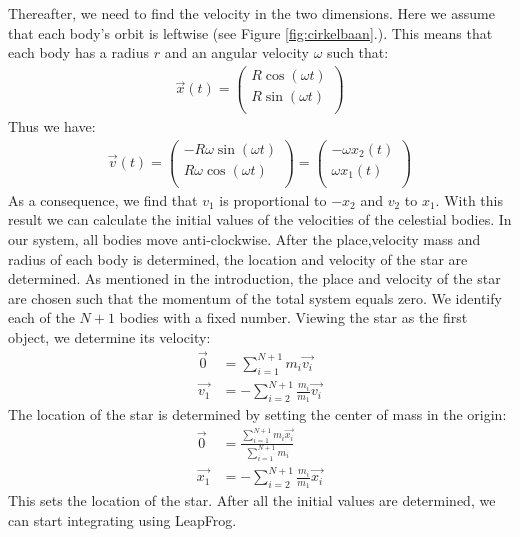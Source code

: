 Thereafter, we need to find the velocity in the two dimensions.
Here we assume that each body's orbit is leftwise (see Figure \ref{fig:cirkelbaan}.).
This means that each body has a radius $r$ and an angular velocity $\omega$ such that:
\begin{align*}
\vec{x}(t) = \begin{pmatrix}
R \cos(\omega t)\\
R \sin(\omega t)\\
\end{pmatrix}
\end{align*} 
Thus we have:
\begin{align*}
\vec{v}(t) = \begin{pmatrix}
-R \omega \sin(\omega t)\\
R \omega \cos(\omega t)\\
\end{pmatrix} = \begin{pmatrix}
-\omega x_2(t)\\
\omega x_1(t)\\
\end{pmatrix}
\end{align*} 
As a consequence, we find that $v_1$ is proportional to $-x_2$ and $v_2$ to $x_1$.
With this result we can calculate the initial values of the velocities of the celestial bodies. 
In our system, all bodies move anti-clockwise. 
After the place,velocity mass and radius of each body is determined, the location and velocity of the star are determined. 
As mentioned in the introduction, the place and velocity of the star are chosen such that the momentum of the total system equals zero.
We identify each of the \(N+1\) bodies with a fixed number. Viewing the star  as the first object, we determine its velocity:
\begin{align*}
	\vec{0}&=\sum_{i=1}^{N+1}m_i\vec{v_i}\\
	\vec{v_1}&=-\sum_{i=2}^{N+1}\frac{m_i}{m_1}\vec{v_i}
\end{align*}
The location of the star is determined by setting the center of mass in the origin:
\begin{align*}
	\vec{0}&=\frac{\sum_{i=1}^{N+1}m_i\vec{x_i}}{\sum_{i=1}^{N+1}m_i}\\
	\vec{x_1}&=-\sum_{i=2}^{N+1}\frac{m_i}{m_1}\vec{x_i}
\end{align*}
This sets the location of the star.
After all the initial values are determined, we can start integrating using LeapFrog.
